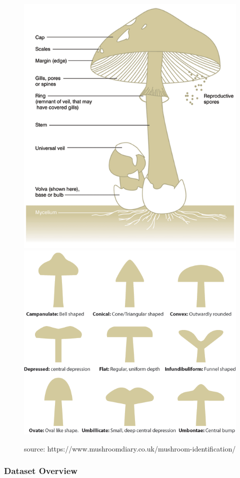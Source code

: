 \documentclass[
]{article}
\begin{document}
\begin{figure}

{\centering \includegraphics[width=0.49\linewidth,height=0.2\textheight]{images/parts-of-a-mushroom} \includegraphics[width=0.49\linewidth,height=0.2\textheight]{images/cap-shapes} 

}

\caption{source: https://www.mushroomdiary.co.uk/mushroom-identification/}\label{fig:unnamed-chunk-2}
\end{figure}

\hypertarget{dataset-overview}{%
\subsubsection{Dataset Overview}\label{dataset-overview}}
\end{document}
